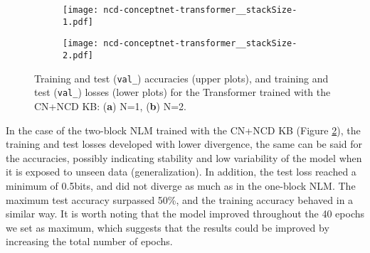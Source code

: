 \documentclass[preprint]{elsarticle}
\begin{document}
\begin{figure}[htb]
	\centering
	\hspace*{\fill}
	\begin{subfigure}[b]{.48\linewidth}
		\centering
		\texttt{[image: ncd-conceptnet-transformer\_\_stackSize-1.pdf]}
		\captionsetup{justification=centering}
		\caption{}
        \label{fig:ncd_conceptnet_hist_plot_N1}
	\end{subfigure}
	\hspace*{\fill}
	\begin{subfigure}[b]{.48\linewidth}
		\centering
		\texttt{[image: ncd-conceptnet-transformer\_\_stackSize-2.pdf]}
		\captionsetup{justification=centering}
		\caption{}
        \label{fig:ncd_conceptnet_hist_plot_N2}
	\end{subfigure}
	\hspace*{\fill}
	\caption{Training and test (\texttt{val\_}) accuracies (upper plots), and training and test (\texttt{val\_}) losses (lower plots) for the Transformer trained with the CN+NCD KB: (\textbf{a}) N=1, (\textbf{b}) N=2.}
	\label{fig:ncd_conceptnet_hist_plot}
\end{figure}

In the case of the two-block NLM trained with the CN+NCD KB (Figure \ref{fig:ncd_conceptnet_hist_plot_N2}), the training and test losses developed with lower divergence, the same can be said for the accuracies, possibly indicating stability and low variability of the model when it is exposed to unseen data (generalization). In addition, the test loss reached a minimum of 0.5bits, and did not diverge as much as in the one-block NLM. The maximum test accuracy surpassed 50\%, and the training accuracy behaved in a similar way. It is worth noting that the model improved throughout the 40 epochs we set as maximum, which suggests that the results could be improved by increasing the total number of epochs.
\end{document}
